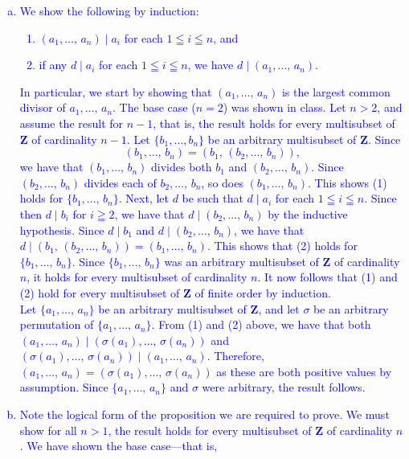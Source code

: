 \documentclass[a4paper,11pt]{article}
\theoremstyle{mythm}
\theoremstyle{mydef}
\newcommand{\blue}[1]{\textcolor{blue}{#1}}
\newcommand{\Z}{\mathbf{Z}}
\begin{document}
\blue{
  \begin{enumerate}[(a)]
  \item We show the following by induction:
    \begin{enumerate}[(1)]
    \item $(a_1,\dots,\,a_n) \mid a_i$ for each $1 \leqq i \leqq n$, and
    \item if any $d \mid a_i$ for each $1 \leqq i \leqq n$, we have $d \mid
      (a_1,\dots,\,a_n)$.
    \end{enumerate}
    In particular, we start by showing that $(a_1,\dots,\,a_n)$ is the largest
    common divisor of $a_1,\dots,\,a_n$.
    The base case ($n=2$) was shown in class. Let $n > 2$, and assume the result
    for $n-1$, that is, the result holds for every multisubset of $\Z$ of
    cardinality $n-1$. Let $\{b_1,\dots,b_n\}$ be an arbitrary multisubset of
    $\Z$. Since
    \[
      (b_1,\dots,\,b_n) = (b_1,\,(b_2,\dots,\,b_n)),
    \]
    we have that $(b_1,\dots,\,b_n)$ divides both $b_1$ and $(b_2,\dots,\,b_n)$.
    Since $(b_2,\dots,\,b_n)$ divides each of $b_2,\dots,\,b_n$, so does
    $(b_1,\dots,\,b_n)$. This shows (1) holds for $\{b_1,\dots,\,b_n\}$. Next,
    let $d$ be such that $d \mid a_i$ for each $1 \leqq i \leqq n$. Since then
    $d \mid b_i$ for $i \geqq 2$, we have that $d \mid (b_2,\dots,\,b_n)$ by the
    inductive hypothesis. Since $d \mid b_1$ and $d \mid (b_2,\dots,\,b_n)$, we
    have that $d \mid (b_1,\,(b_2,\dots,\,b_n))=(b_1,\dots,\,b_n)$. This shows
    that (2) holds for $\{b_1,\dots,\,b_n\}$. Since $\{b_1,\dots,\,b_n\}$ was an
    arbitrary multisubset of $\Z$ of cardinality $n$, it holds for every
    multisubset of cardinality $n$. It now follows that (1) and (2) hold for
    every multisubset of $\Z$ of finite order by induction. \\
    Let $\{a_1,\dots,\,a_n\}$ be an arbitrary multisubset of $\Z$, and let
    $\sigma$ be an arbitrary permutation of $\{a_1,\dots,\,a_n\}$. From (1) and
    (2) above, we have that both $(a_1,\dots,\,a_n) \mid
    (\sigma(a_1),\dots,\,\sigma(a_n))$ and $(\sigma(a_1),\dots,\,\sigma(a_n))
    \mid (a_1,\dots,\,a_n)$. Therefore,
    $(a_1,\dots,\,a_n)=(\sigma(a_1),\dots,\,\sigma(a_n))$ as these are both
    positive values by assumption. Since $\{a_1,\dots,\,a_n\}$ and $\sigma$ were
    arbitrary, the result follows.
  \item Note the logical form of the proposition we are
required to prove. We must show for all $n>1$, the result holds for every
multisubset of $\Z$ of cardinality $n$. We have shown the base case---that is,

\end{enumerate}}
\end{document}
